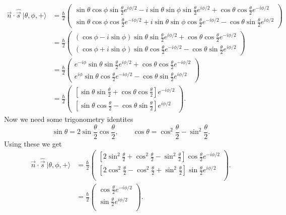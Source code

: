 \documentclass[a4paper, 11pt, titlepage, english]{article}
\newcommand{\ket}[1]{|#1 \rangle}
\newcommand{\op}[1]{\hat{#1}}
\begin{document}
\begin{align*}
\vec{n}\cdot\op{\vec{s}}\ \ket{\theta, \phi, +} &= \frac{\hbar}{2} 
\begin{pmatrix} 
\sin\theta\cos\phi\sin{\frac{\theta}{2}}e^{i\phi/2} -i\sin\theta\sin\phi \sin{\frac{\theta}{2}}e^{i\phi/2} + \cos\theta\cos\frac{\theta}{2}e^{-i\phi/2} \\[0.1cm]
\sin\theta\cos\phi\cos\frac{\theta}{2}e^{-i\phi/2} + i\sin\theta\sin\phi\cos\frac{\theta}{2}e^{-i\phi/2} -\cos\theta\sin{\frac{\theta}{2}}e^{i\phi/2}
\end{pmatrix} \\[0.5cm]
&= 
\frac{\hbar}{2} 
\begin{pmatrix}
\left(\cos\phi - i\sin\phi\right)\sin\theta\sin{\frac{\theta}{2}}e^{i\phi/2} + \cos\theta\cos\frac{\theta}{2}e^{-i\phi/2}  \\[0.1cm]
\left(\cos\phi + i\sin\phi\right)\sin\theta\cos\frac{\theta}{2}e^{-i\phi/2} - \cos\theta\sin{\frac{\theta}{2}}e^{i\phi/2}
\end{pmatrix} \\[0.5cm]
&= \frac{\hbar}{2} 
\begin{pmatrix}
e^{-i\phi}\sin\theta\sin{\frac{\theta}{2}}e^{i\phi/2} + \cos\theta\cos\frac{\theta}{2}e^{-i\phi/2}  \\[0.1cm]
e^{i\phi}\sin\theta\cos\frac{\theta}{2}e^{-i\phi/2} - \cos\theta\sin{\frac{\theta}{2}}e^{i\phi/2}
\end{pmatrix}\\[0.5cm]
&= \frac{\hbar}{2}
\begin{pmatrix}
\left[\sin\theta\sin{\frac{\theta}{2}} + \cos\theta\cos\frac{\theta}{2}\right]e^{-i\phi/2}  \\[0.1cm]
\left[\sin\theta\cos\frac{\theta}{2} - \cos\theta\sin{\frac{\theta}{2}}\right]e^{i\phi/2}
\end{pmatrix}.
\end{align*}
Now we need some trigonometry identites
\begin{equation}
\sin \theta = 2\sin\frac{\theta}{2}\cos\frac{\theta}{2}, \qquad \cos \theta = \cos^2\frac{\theta}{2} - \sin^2\frac{\theta}{2}. \label{eq:trig}
\end{equation}
Using these we get
\begin{align*}
\vec{n}\cdot\op{\vec{s}}\ \ket{\theta, \phi, +} &=\frac{\hbar}{2}
\begin{pmatrix}
\left[2\sin^2{\frac{\theta}{2}} + \cos^2\frac{\theta}{2} - \sin^2{\frac{\theta}{2}}\right]\cos\frac{\theta}{2} e^{-i\phi/2}  \\[0.1cm]
\left[2\cos^2\frac{\theta}{2} - \cos^2\frac{\theta}{2} + \sin^2{\frac{\theta}{2}}\right]\sin{\frac{\theta}{2}} e^{i\phi/2}  \\
\end{pmatrix}. \\[0.5cm] &=\frac{\hbar}{2}
\begin{pmatrix}
\cos\frac{\theta}{2}e^{-i\phi/2}  \\[0.1cm]
\sin\frac{\theta}{2}e^{i\phi/2}  \\
\end{pmatrix}.
\end{align*}
\end{document}
